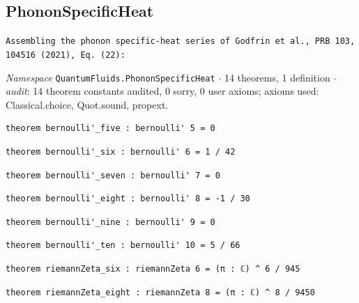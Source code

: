 \subsection{PhononSpecificHeat}\label{appA:PhononSpecificHeat}
{\footnotesize\raggedright\texttt{Assembling the phonon specific-\allowbreak{}heat series of Godfrin et al.\allowbreak{},\allowbreak{} PRB 103,\allowbreak{} 104516 (2021),\allowbreak{} Eq.\allowbreak{} (22):}\par}
{\footnotesize\raggedright\emph{Namespace} \texttt{QuantumFluids.\allowbreak{}PhononSpecificHeat} $\cdot$ 14 theorems, 1 definition $\cdot$ \emph{audit}: 14 theorem constants audited, 0 sorry, 0 user axioms; axioms used: Classical.choice, Quot.sound, propext.\par}
\vspace{1pt}
\begin{lstlisting}[style=leancat]
theorem bernoulli'_five : bernoulli' 5 = 0
\end{lstlisting}

\begin{lstlisting}[style=leancat]
theorem bernoulli'_six : bernoulli' 6 = 1 / 42
\end{lstlisting}

\begin{lstlisting}[style=leancat]
theorem bernoulli'_seven : bernoulli' 7 = 0
\end{lstlisting}

\begin{lstlisting}[style=leancat]
theorem bernoulli'_eight : bernoulli' 8 = -1 / 30
\end{lstlisting}

\begin{lstlisting}[style=leancat]
theorem bernoulli'_nine : bernoulli' 9 = 0
\end{lstlisting}

\begin{lstlisting}[style=leancat]
theorem bernoulli'_ten : bernoulli' 10 = 5 / 66
\end{lstlisting}

\begin{lstlisting}[style=leancat]
theorem riemannZeta_six : riemannZeta 6 = (π : ℂ) ^ 6 / 945
\end{lstlisting}

\begin{lstlisting}[style=leancat]
theorem riemannZeta_eight : riemannZeta 8 = (π : ℂ) ^ 8 / 9450
\end{lstlisting}


